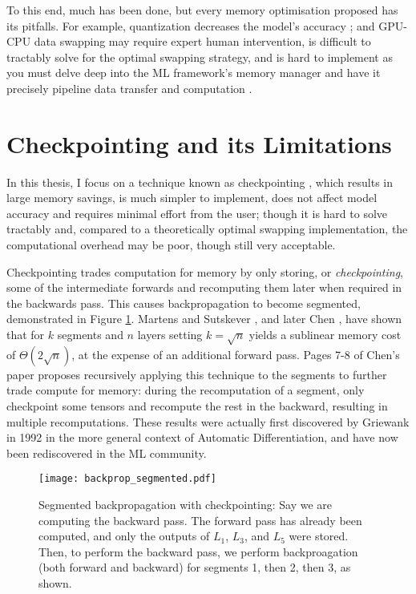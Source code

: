 To this end, much has been done, but every memory optimisation proposed has its pitfalls. For example, quantization decreases the model's accuracy \cite{Zhou2016}; and GPU-CPU data swapping may require expert human intervention, is difficult to tractably solve for the optimal swapping strategy, and is hard to implement as you must delve deep into the ML framework's memory manager and have it precisely pipeline data transfer and computation \cite{Rhu2016, B, Zhang2019, Wang2018}.

\section*{Checkpointing and its Limitations}
In this thesis, I focus on a technique known as checkpointing \cite{Dauvergne2006, Martens2012, Siskind2018, Chen2016, Gruslys2016, Wang2018}, which results in large memory savings, is much simpler to implement, does not affect model accuracy and requires minimal effort from the user; though it is hard to solve tractably and, compared to a theoretically optimal swapping implementation, the computational overhead may be poor, though still very acceptable.

Checkpointing trades computation for memory by only storing, or \textit{checkpointing}, some of the intermediate forwards and recomputing them later when required in the backwards pass. This causes backpropagation to become segmented, demonstrated in Figure \ref{fig:1-backprop-segmented}.  Martens and Sutskever \cite{Martens2012}, and later Chen \cite{Chen2016}, have shown that for \(k\) segments and \(n\) layers setting \(k = \sqrt{n}\) yields a sublinear memory cost of \(\Theta (2\sqrt{n})\), at the expense of an additional forward pass. Pages 7-8 of Chen's paper proposes recursively applying this technique to the segments to further trade compute for memory: during the recomputation of a segment, only checkpoint some tensors and recompute the rest in the backward, resulting in multiple recomputations.
These results were actually first discovered by Griewank in 1992 \cite{Griewank1992} in the more general context of Automatic Differentiation, and have now been rediscovered in the ML community.

\begin{figure}[t]
    \centering
    \texttt{[image: backprop\_segmented.pdf]}
    \caption{Segmented backpropagation with checkpointing: Say we are computing the backward pass. The forward pass has already been computed, and only the outputs of \(L_1\), \(L_3\), and \(L_5\) were stored. Then, to perform the backward pass, we perform backproagation (both forward and backward) for segments 1, then 2, then 3, as shown.}
    \label{fig:1-backprop-segmented}
\end{figure}

